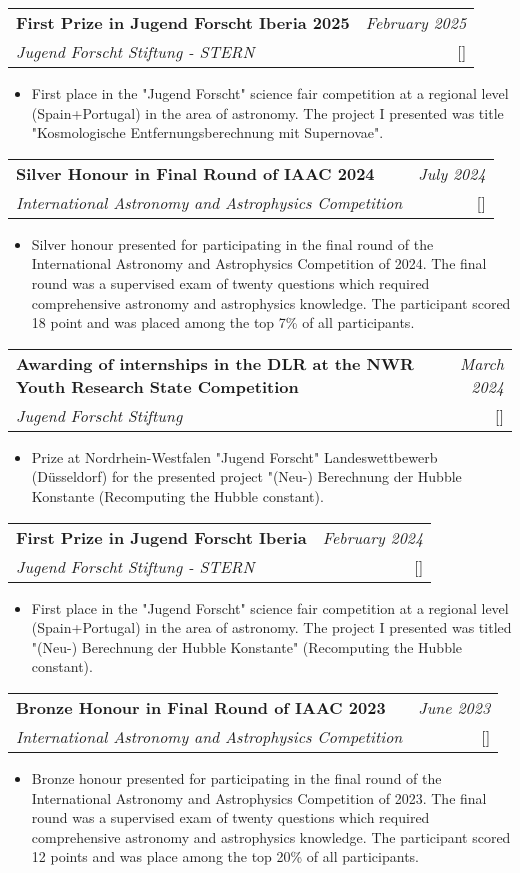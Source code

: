 \documentclass[a4paper,11pt]{article}
\makeatletter
\newcommand{\resumeProject}[4]{
\vspace{0.5mm}\item
    \begin{tabular*}{0.98\textwidth}[t]{l@{\extracolsep{\fill}}r}
        \textbf{#1} & \textit{\footnotesize{#3}} \\
        \footnotesize{\textit{#2}} & \footnotesize{#4}
    \end{tabular*}
    \vspace{-2.4mm}
}
\newcommand{\resumeItemListStart}{\begin{itemize}[leftmargin=*,labelsep=1mm,itemsep=0.5mm]}
\newcommand{\resumeItemListEnd}{\end{itemize}\vspace{-2mm}}
\makeatother
\begin{document}
{\resumeProject
  {First Prize in Jugend Forscht Iberia 2025}
  {Jugend Forscht Stiftung - STERN}
  {February 2025}
  {{}[\href{https://jugend-forscht.de}{\textcolor{darkblue}{\faIcon{globe}}}]}
\resumeItemListStart
  \item First place in the "Jugend Forscht" science fair competition at a regional level (Spain+Portugal) in the area of astronomy. The project I presented was title "Kosmologische Entfernungsberechnung mit Supernovae".
\resumeItemListEnd

\resumeProject
  {Silver Honour in Final Round of IAAC 2024}
  {International Astronomy and Astrophysics Competition}
  {July 2024}
  {{}[\href{https://iaac.space/en/}{\textcolor{darkblue}{\faIcon{globe}}}]}
\resumeItemListStart
\item Silver honour presented for participating in the final round of the International Astronomy and Astrophysics Competition of 2024. The final round was a supervised exam of twenty questions which required comprehensive astronomy and astrophysics knowledge. The participant scored 18 point and was placed among the top 7\% of all participants.
\resumeItemListEnd

\resumeProject
  {Awarding of internships in the DLR at the NWR Youth Research State Competition}
  {Jugend Forscht Stiftung}
  {March 2024}
  {{}[\href{https://jugend-forscht.de}{\textcolor{darkblue}{\faIcon{globe}}}]}
\resumeItemListStart
  \item Prize at Nordrhein-Westfalen "Jugend Forscht" Landeswettbewerb (Düsseldorf) for the presented project "(Neu-) Berechnung der Hubble Konstante (Recomputing the Hubble constant).
\resumeItemListEnd

\resumeProject
  {First Prize in Jugend Forscht Iberia}
  {Jugend Forscht Stiftung - STERN}
  {February 2024}
  {{}[\href{https://jugend-forscht.de}{\textcolor{darkblue}{\faIcon{globe}}}]}
\resumeItemListStart
  \item First place in the "Jugend Forscht" science fair competition at a regional level (Spain+Portugal) in the area of astronomy. The project I presented was titled "(Neu-) Berechnung der Hubble Konstante" (Recomputing the Hubble constant).
\resumeItemListEnd

\resumeProject
  {Bronze Honour in Final Round of IAAC 2023}
  {International Astronomy and Astrophysics Competition}
  {June 2023}
  {{}[\href{https://iaac.space}{\textcolor{darkblue}{\faIcon{globe}}}]}
\resumeItemListStart
  \item Bronze honour presented for participating in the final round of the International Astronomy and Astrophysics Competition of 2023. The final round was a supervised exam of twenty questions which required comprehensive astronomy and astrophysics knowledge. The participant scored 12 points and was place among the top 20\% of all participants.
\resumeItemListEnd

}
\end{document}
